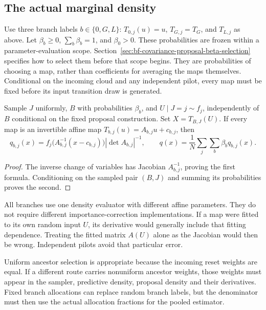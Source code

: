 \subsection{The actual marginal density}

Use three branch labels \(b\in\{0,G,L\}\):
\(T_{0,j}(u)=u\), \(T_{G,j}=T_G\), and \(T_{L,j}\) as above.
Let \(\beta_b\geq0\), \(\sum_b\beta_b=1\), and \(\beta_0>0\).
These probabilities are frozen within a parameter-evaluation scope.
Section~\ref{sec:bf-covariance-proposal-beta-selection} specifies how to
select them before that scope begins. They are probabilities of choosing
a map, rather than coefficients for averaging the maps themselves.
Conditional on the incoming cloud and any independent pilot, every map
must be fixed before its input transition draw is generated.

\begin{proposition}
Sample \(J\) uniformly, \(B\) with probabilities \(\beta_b\), and
\(U\mid J=j\sim f_j\), independently of \(B\) conditional on the fixed
proposal construction. Set \(X=T_{B,J}(U)\). If every map is an invertible
affine map \(T_{b,j}(u)=A_{b,j}u+c_{b,j}\), then
\begin{equation}
\label{eq:bf-covariance-proposal-mapped-density}
 q_{b,j}(x)=
 f_j\bigl(A_{b,j}^{-1}(x-c_{b,j})\bigr)
 |\det A_{b,j}|^{-1},\qquad
 q(x)=\frac1N\sum_j\sum_b\beta_b q_{b,j}(x).
\end{equation}
\end{proposition}
\begin{proof}
The inverse change of variables has Jacobian \(A_{b,j}^{-1}\), proving
the first formula. Conditioning on the sampled pair \((B,J)\) and summing
its probabilities proves the second.
\end{proof}

All branches use one density evaluator with different affine parameters.
They do not require different importance-correction implementations.
If a map were fitted to its own random input \(U\), its derivative would
generally include that fitting dependence. Treating the fitted matrix
\(A(U)\) alone as the Jacobian would then be wrong. Independent pilots
avoid that particular error.

Uniform ancestor selection is appropriate because the incoming reset
weights are equal. If a different route carries nonuniform ancestor
weights, those weights must appear in the sampler, predictive density,
proposal density and their derivatives. Fixed branch allocations can
replace random branch labels, but the denominator must then use the
actual allocation fractions for the pooled estimator.

